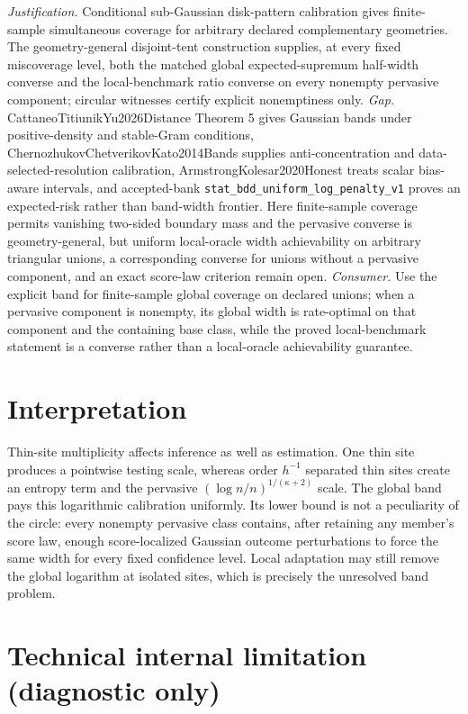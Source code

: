 \documentclass{article}
\begin{document}
\par\smallskip\noindent \textit{Justification.} Conditional sub-Gaussian disk-pattern calibration gives finite-sample simultaneous coverage for arbitrary declared complementary geometries. The geometry-general disjoint-tent construction supplies, at every fixed miscoverage level, both the matched global expected-supremum half-width converse and the local-benchmark ratio converse on every nonempty pervasive component; circular witnesses certify explicit nonemptiness only. \textit{Gap.} CattaneoTitiunikYu2026Distance Theorem 5 gives Gaussian bands under positive-density and stable-Gram conditions, ChernozhukovChetverikovKato2014Bands supplies anti-concentration and data-selected-resolution calibration, ArmstrongKolesar2020Honest treats scalar bias-aware intervals, and accepted-bank \texttt{stat\_bdd\_uniform\_log\_penalty\_v1} proves an expected-risk rather than band-width frontier. Here finite-sample coverage permits vanishing two-sided boundary mass and the pervasive converse is geometry-general, but uniform local-oracle width achievability on arbitrary triangular unions, a corresponding converse for unions without a pervasive component, and an exact score-law criterion remain open. \textit{Consumer.} Use the explicit band for finite-sample global coverage on declared unions; when a pervasive component is nonempty, its global width is rate-optimal on that component and the containing base class, while the proved local-benchmark statement is a converse rather than a local-oracle achievability guarantee.

\section{Interpretation}

Thin-site multiplicity affects inference as well as estimation. One thin site produces a pointwise testing scale, whereas order \(h^{-1}\) separated thin sites create an entropy term and the pervasive \((\log n/n)^{1/(\kappa+2)}\) scale. The global band pays this logarithmic calibration uniformly. Its lower bound is not a peculiarity of the circle: every nonempty pervasive class contains, after retaining any member's score law, enough score-localized Gaussian outcome perturbations to force the same width for every fixed confidence level. Local adaptation may still remove the global logarithm at isolated sites, which is precisely the unresolved band problem.

\section*{Technical internal limitation (diagnostic only)}
\end{document}

